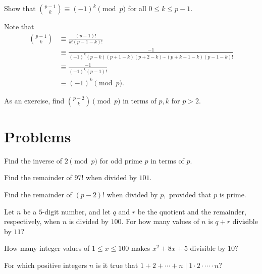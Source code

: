 \documentclass[mast]{lucky}
\begin{document}
\begin{exam}
Show that $\binom{p-1}{k}\equiv (-1)^k\pmod{p}$ for all $0\leq k\leq p-1.$
\end{exam}

\begin{sol}
Note that
\begin{align*}
\binom{p-1}{k}&\equiv \frac{(p-1)!}{k!(p-1-k)!}\\
&\equiv \frac{-1}{(-1)^{k}(p-k)(p+1-k)(p+2-k)\cdots(p+k-1-k)(p-1-k)!}\\
&\equiv \frac{-1}{(-1)^k(p-1)!}\\
&\equiv (-1)^k\pmod{p}.
\end{align*}
\end{sol}

As an exercise, find $\binom{p-2}{k}\pmod{p}$ in terms of $p,k$ for $p>2.$

\pagebreak

\section{Problems}


\begin{prob}[]{1}
Find the inverse of $2\pmod {p}$ for odd prime $p$ in terms of $p.$
\end{prob}
    
\begin{prob}[]{1}
Find the remainder of $97!$ when divided by $101.$
\end{prob}
    
\begin{prob}[]{1}
Find the remainder of $(p-2)!$ when divided by $p,$ provided that $p$ is prime.
\end{prob}
    
\begin{prob}[AMC 12A 2003/18]{2}
Let $n$ be a $5$-digit number, and let $q$ and $r$ be the quotient and the remainder, respectively, when $n$ is divided by $100$. For how many values of $n$ is $q+r$ divisible by $11$?
\end{prob}
    
\begin{prob}{2}
How many integer values of $1\leq x\leq 100$ makes $x^2+8x+5$ divisible by $10?$
\end{prob}
    
\begin{prob}{2}
For which positive integers $n$ is it true that $1+2+\cdots+n\mid 1\cdot 2\cdot \cdots \cdot n$?
\end{prob}
\end{document}
